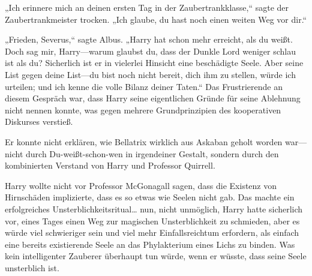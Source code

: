 „Ich erinnere mich an deinen ersten Tag in der Zaubertrankklasse,“ sagte der Zaubertrankmeister trocken. „Ich glaube, du hast noch einen weiten Weg vor dir.“

„Frieden, Severus,“ sagte Albus. „Harry hat schon mehr erreicht, als du weißt. Doch sag mir, Harry—warum glaubst du, dass der Dunkle Lord weniger schlau ist als du? Sicherlich ist er in vielerlei Hinsicht eine beschädigte Seele. Aber seine List gegen deine List—du bist noch nicht bereit, dich ihm zu stellen, würde ich urteilen; und ich kenne die volle Bilanz deiner Taten.“ \later Das Frustrierende an diesem Gespräch war, dass Harry seine eigentlichen Gründe für seine Ablehnung nicht nennen konnte, was gegen mehrere Grundprinzipien des kooperativen Diskurses verstieß.

Er konnte nicht erklären, wie Bellatrix wirklich aus Askaban geholt worden war—nicht durch Du-weißt-schon-wen in irgendeiner Gestalt, sondern durch den kombinierten Verstand von Harry und Professor Quirrell.

Harry wollte nicht vor Professor McGonagall sagen, dass die Existenz von Hirnschäden implizierte, dass es so etwas wie Seelen nicht gab. Das machte ein erfolgreiches Unsterblichkeitsritual… nun, nicht unmöglich, Harry hatte sicherlich vor, eines Tages einen Weg zur magischen Unsterblichkeit zu schmieden, aber es würde viel schwieriger sein und viel mehr Einfallsreichtum erfordern, als einfach eine bereits existierende Seele an das Phylakterium eines Lichs zu binden. Was kein intelligenter Zauberer überhaupt tun würde, wenn er wüsste, dass seine Seele unsterblich ist.

